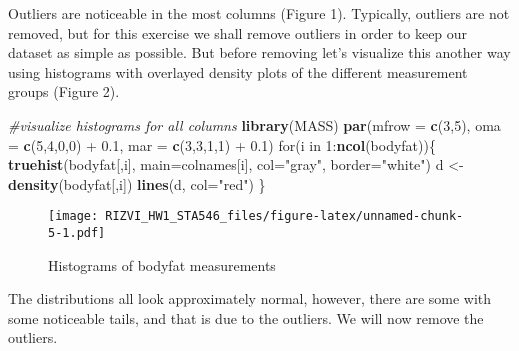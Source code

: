 \documentclass[]{article}
\newenvironment{Shaded}{\begin{snugshade}}{\end{snugshade}}
\newcommand{\KeywordTok}[1]{\textcolor[rgb]{0.13,0.29,0.53}{\textbf{{#1}}}}
\newcommand{\DataTypeTok}[1]{\textcolor[rgb]{0.13,0.29,0.53}{{#1}}}
\newcommand{\DecValTok}[1]{\textcolor[rgb]{0.00,0.00,0.81}{{#1}}}
\newcommand{\FloatTok}[1]{\textcolor[rgb]{0.00,0.00,0.81}{{#1}}}
\newcommand{\StringTok}[1]{\textcolor[rgb]{0.31,0.60,0.02}{{#1}}}
\newcommand{\CommentTok}[1]{\textcolor[rgb]{0.56,0.35,0.01}{\textit{{#1}}}}
\newcommand{\NormalTok}[1]{{#1}}
\begin{document}
Outliers are noticeable in the most columns (Figure 1). Typically,
outliers are not removed, but for this exercise we shall remove outliers
in order to keep our dataset as simple as possible. But before removing
let's visualize this another way using histograms with overlayed density
plots of the different measurement groups (Figure 2).

\begin{Shaded}
\begin{Highlighting}[]
\CommentTok{#visualize histograms for all columns}
\KeywordTok{library}\NormalTok{(MASS)}
\KeywordTok{par}\NormalTok{(}\DataTypeTok{mfrow =} \KeywordTok{c}\NormalTok{(}\DecValTok{3}\NormalTok{,}\DecValTok{5}\NormalTok{),}
          \DataTypeTok{oma =} \KeywordTok{c}\NormalTok{(}\DecValTok{5}\NormalTok{,}\DecValTok{4}\NormalTok{,}\DecValTok{0}\NormalTok{,}\DecValTok{0}\NormalTok{) +}\StringTok{ }\FloatTok{0.1}\NormalTok{,}
          \DataTypeTok{mar =} \KeywordTok{c}\NormalTok{(}\DecValTok{3}\NormalTok{,}\DecValTok{3}\NormalTok{,}\DecValTok{1}\NormalTok{,}\DecValTok{1}\NormalTok{) +}\StringTok{ }\FloatTok{0.1}\NormalTok{)}
\NormalTok{for(i in }\DecValTok{1}\NormalTok{:}\KeywordTok{ncol}\NormalTok{(bodyfat))\{}
        \KeywordTok{truehist}\NormalTok{(bodyfat[,i], }\DataTypeTok{main=}\NormalTok{colnames[i], }\DataTypeTok{col=}\StringTok{"gray"}\NormalTok{, }\DataTypeTok{border=}\StringTok{"white"}\NormalTok{)}
             \NormalTok{d <-}\StringTok{ }\KeywordTok{density}\NormalTok{(bodyfat[,i])}
             \KeywordTok{lines}\NormalTok{(d, }\DataTypeTok{col=}\StringTok{"red"}\NormalTok{)}
\NormalTok{\}}
\end{Highlighting}
\end{Shaded}

\begin{figure}[htbp]
\centering
\texttt{[image: RIZVI\_HW1\_STA546\_files/figure-latex/unnamed-chunk-5-1.pdf]}
\caption{Histograms of bodyfat measurements}
\end{figure}

The distributions all look approximately normal, however, there are some
with some noticeable tails, and that is due to the outliers. We will now
remove the outliers.

\begin{Shaded}
\end{Shaded}
\end{document}

